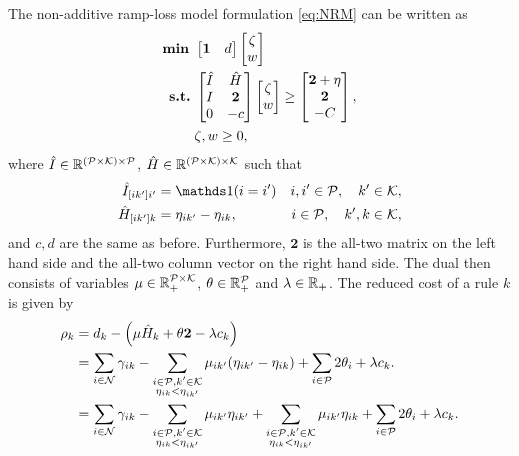 The non-additive ramp-loss model formulation \eqref{eq:NRM} can be written as
\begin{equation}\label{eq:NRM_primal_vector}
    \begin{split}
        \text{\textbf{min }} & \begin{bmatrix}
                   \bm{1} & d
        \end{bmatrix} \begin{bmatrix}
                          \zeta \\ w
        \end{bmatrix} \\
        \text{\textbf{s.t.}}\; & \begin{bmatrix}
                  \hat{I} & \hat{H} \\
                  I & \mathbf{2} \\
                  0 & -c
        \end{bmatrix} \begin{bmatrix}
                          \zeta \\ w
        \end{bmatrix}
        \geq \begin{bmatrix}
                 \bm{2} + \eta \\ \bm{2} \\  -C
        \end{bmatrix}, \\
        & \zeta, w \geq 0,
    \end{split}
\end{equation}
where $\hat{I} \in \mathbb{R}^{(\mathcal{P} \times \mathcal{K})\times \mathcal{P}}$, $\hat{H}\in \mathbb{R}^{(\mathcal{P} \times \mathcal{K}) \times \mathcal{K}}$ such that
\begin{align*}
    \hat{I}_{[ik']i'} &= \Ind(i = i') & i, i' \in \P, \quad k' \in \K, \\
    \hat{H}_{[ik']k} &= \eta_{ik'} - \eta_{ik}, & i \in \P, \quad k', k \in \K,
\end{align*}
and $c, d$ are the same as before.
Furthermore, $\mathbf{2}$ is the all-two matrix on the left hand side
and the all-two column vector on the right hand side.
The dual then consists of variables $\mu \in \mathbb{R}_+^{\mathcal{P} \times \mathcal{K}}$, $\theta \in \mathbb{R}_+^{\mathcal{P}}$ and $\lambda \in \mathbb{R}_+$.
The reduced cost of a rule $k$ is given by
\begin{equation}\label{eq:NRP_redcost_vector_derivation}
    \begin{split}
        \rho_k &= d_k - \left(\mu \hat{H}_k + \theta\mathbf{2} - \lambda c_k\right) \\
        &= \sum_{i \in \mathcal{N}} \gamma_{ik} - \sum_{\substack{i \in \mathcal{P}, k' \in \mathcal{K} \\ \eta_{ik} < \eta_{ik'}}} \mu_{ik'}(\eta_{ik'}-\eta_{ik}) + \sum_{i \in \mathcal{P}} 2\theta_i + \lambda c_k. \\
        &= \sum_{i \in \mathcal{N}} \gamma_{ik} - \sum_{\substack{i \in \mathcal{P}, k' \in \mathcal{K} \\ \eta_{ik} < \eta_{ik'}}} \mu_{ik'}\eta_{ik'} + \sum_{\substack{i \in \mathcal{P}, k' \in \mathcal{K} \\ \eta_{ik} < \eta_{ik'}}} \mu_{ik'}\eta_{ik} + \sum_{i \in \mathcal{P}} 2\theta_i + \lambda c_k. \\
    \end{split}
\end{equation}
